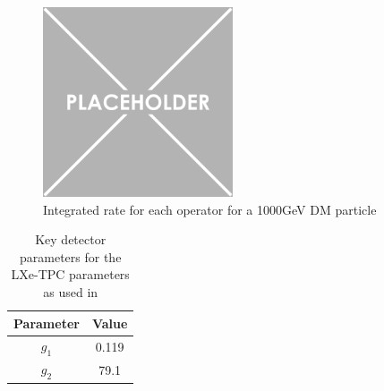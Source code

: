\begin{figure}
    \centering
    \includegraphics[width=0.5\textwidth]{Figures/Placeholder.png}
    \caption{Integrated rate for each operator for a 1000GeV DM particle}
    \label{fig:operator_integrated_rate}
\end{figure}

\begin{table}[]
    \centering
    \begin{tabular}{c|c}
        Parameter   & Value  \\ \hline
        $g_{1}$     & 0.119 \\
        $g_{2}$     & 79.1  
    \end{tabular}
    \caption{Key detector parameters for the LXe-TPC parameters as used in \cite{LZ_projected_sensitivity_paper_ref}}
    \label{tab:projected_sensitivity_detector_parameters}
\end{table}
